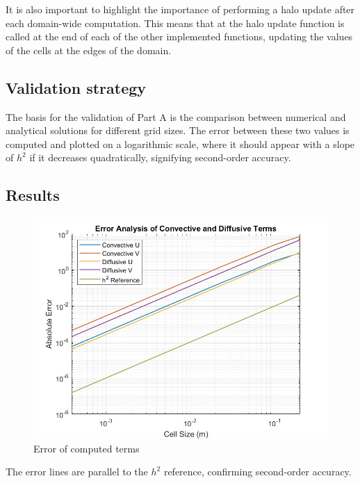 It is also important to highlight the importance of performing a halo update after each domain-wide computation. This means that at the halo update function is called at the end of each of the other implemented functions, updating the values of the cells at the edges of the domain.

\subsection{Validation strategy}

The basis for the validation of Part A is the comparison between numerical and analytical solutions for different grid sizes. The error between these two values is computed and plotted on a logarithmic scale, where it should appear with a slope of $h^2$ if it decreases quadratically, signifying second-order accuracy.

\subsection{Results}

\begin{figure}[H]
    \centering
    \includegraphics[width=0.7\linewidth]{imatges/PartAgraph.jpg}
    \caption{Error of computed terms}
    \label{fig:PartAError}
\end{figure}

The error lines are parallel to the $h^2$ reference, confirming second-order accuracy.